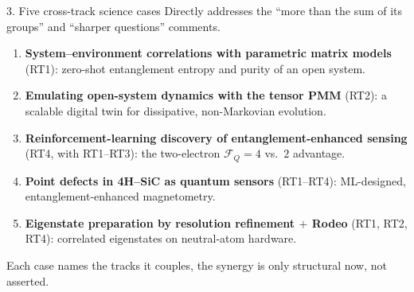 \documentclass[10pt,aspectratio=169]{beamer}
\begin{document}
\begin{frame}{3. Five cross-track science cases}
  Directly addresses the ``more than the sum of its groups'' and ``sharper questions'' comments.
  \vfill
  \begin{enumerate}\small
    \item \textbf{System--environment correlations with parametric matrix models} (RT1): zero-shot
          entanglement entropy and purity of an open system.
    \item \textbf{Emulating open-system dynamics with the tensor PMM} (RT2): a scalable digital twin
          for dissipative, non-Markovian evolution.
    \item \textbf{Reinforcement-learning discovery of entanglement-enhanced sensing} (RT4, with
          RT1--RT3): the two-electron $\mathcal{F}_Q=4$ vs.\ $2$ advantage.
    \item \textbf{Point defects in 4H--SiC as quantum sensors} (RT1--RT4): ML-designed,
          entanglement-enhanced magnetometry.
    \item \textbf{Eigenstate preparation by resolution refinement $+$ Rodeo} (RT1, RT2, RT4):
          correlated eigenstates on neutral-atom hardware.
  \end{enumerate}
  \vfill
  \begin{center}\small Each case names the tracks it couples, the synergy is only structural now, not asserted.\end{center}
\end{frame}
\end{document}
